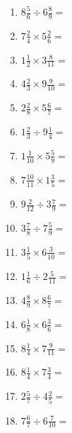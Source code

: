 \documentclass[12pt]{article}
\begin{document}
\begin{enumerate}
\item \large $ 8 \frac{5}{6} \div 6 \frac{8}{9} = $ \vspace{1.6cm}
\item \large $ 7 \frac{2}{4} \times 5 \frac{2}{6} = $ \vspace{1.6cm}
\item \large $ 1 \frac{1}{2} \times 3 \frac{8}{11} = $ \vspace{1.6cm}
\item \large $ 4 \frac{2}{3} \times 9 \frac{9}{10} = $ \vspace{1.6cm}
\newpage
\item \large $ 2 \frac{2}{8} \times 5 \frac{6}{7} = $ \vspace{1.6cm}
\item \large $ 1 \frac{2}{3} \div 9 \frac{1}{4} = $ \vspace{1.6cm}
\item \large $ 1 \frac{1}{10} \times 5 \frac{5}{9} = $ \vspace{1.6cm}
\item \large $ 7 \frac{10}{11} \times 1 \frac{3}{5} = $ \vspace{1.6cm}
\item \large $ 9 \frac{2}{12} \div 3 \frac{7}{9} = $ \vspace{1.6cm}
\item \large $ 3 \frac{7}{8} \div 7 \frac{5}{9} = $ \vspace{1.6cm}
\item \large $ 3 \frac{1}{5} \times 6 \frac{3}{10} = $ \vspace{1.6cm}
\item \large $ 1 \frac{1}{6} \div 2 \frac{5}{11} = $ \vspace{1.6cm}
\item \large $ 4 \frac{8}{9} \times 8 \frac{6}{7} = $ \vspace{1.6cm}
\item \large $ 6 \frac{1}{8} \times 6 \frac{3}{6} = $ \vspace{1.6cm}
\newpage
\item \large $ 8 \frac{1}{4} \times 7 \frac{9}{11} = $ \vspace{1.6cm}
\item \large $ 8 \frac{1}{4} \times 7 \frac{3}{4} = $ \vspace{1.6cm}
\item \large $ 2 \frac{5}{7} \div 4 \frac{2}{5} = $ \vspace{1.6cm}
\item \large $ 7 \frac{6}{7} \div 6 \frac{7}{10} = $ \vspace{1.6cm}

\end{enumerate}
\end{document}
